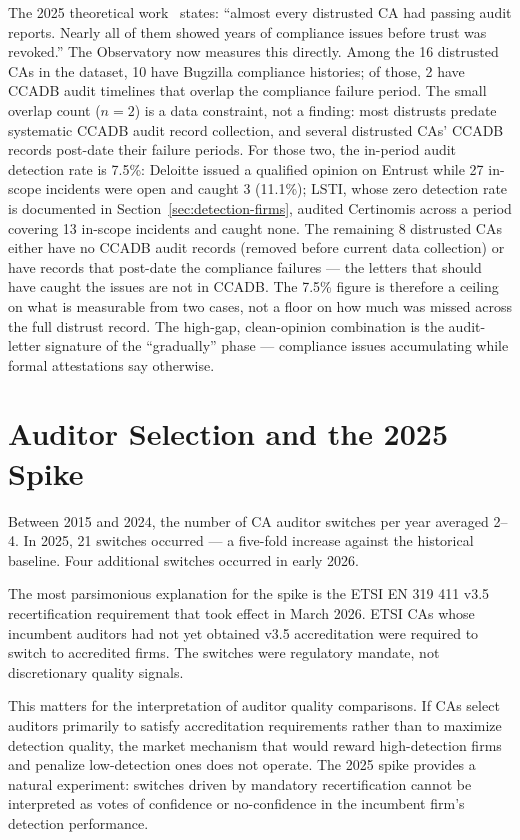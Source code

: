 \documentclass[10pt,twocolumn,letterpaper]{article}
\begin{document}
The 2025 theoretical work~\cite{hurst2025} states: ``almost every distrusted
CA had passing audit reports. Nearly all of them showed years of
compliance issues before trust was revoked.'' The Observatory now
measures this directly. Among the 16 distrusted CAs in the dataset,
10 have Bugzilla compliance histories; of those, 2 have CCADB audit
timelines that overlap the compliance failure period. The small overlap
count ($n=2$) is a data constraint, not a finding: most distrusts
predate systematic CCADB audit record collection, and several distrusted
CAs' CCADB records post-date their failure periods. For those two,
the in-period audit detection rate is 7.5\%: Deloitte issued a
qualified opinion on Entrust while 27 in-scope incidents were open
and caught 3 (11.1\%); LSTI, whose zero detection rate is documented
in Section~\ref{sec:detection-firms}, audited Certinomis across a
period covering 13 in-scope incidents and caught none. The remaining
8 distrusted CAs either have no CCADB audit records (removed before
current data collection) or have records that post-date the compliance
failures --- the letters that should have caught the issues are not
in CCADB. The 7.5\% figure is therefore a ceiling on what is
measurable from two cases, not a floor on how much was missed across
the full distrust record. The high-gap,
clean-opinion combination is the audit-letter signature of the
``gradually'' phase --- compliance issues accumulating while formal
attestations say otherwise.

\section{Auditor Selection and the 2025 Spike}
\label{sec:switches}

Between 2015 and 2024, the number of CA auditor switches per year
averaged 2--4. In 2025, 21 switches occurred --- a five-fold increase
against the historical baseline. Four additional switches occurred in
early 2026.

The most parsimonious explanation for the spike is the ETSI EN 319 411
v3.5 recertification requirement that took effect in March 2026. ETSI
CAs whose incumbent auditors had not yet obtained v3.5 accreditation
were required to switch to accredited firms. The switches were
regulatory mandate, not discretionary quality signals.

This matters for the interpretation of auditor quality comparisons.
If CAs select auditors primarily to satisfy accreditation requirements
rather than to maximize detection quality, the market mechanism that
would reward high-detection firms and penalize low-detection ones
does not operate. The 2025 spike provides a natural experiment:
switches driven by mandatory recertification cannot be interpreted
as votes of confidence or no-confidence in the incumbent firm's
detection performance.
\end{document}
